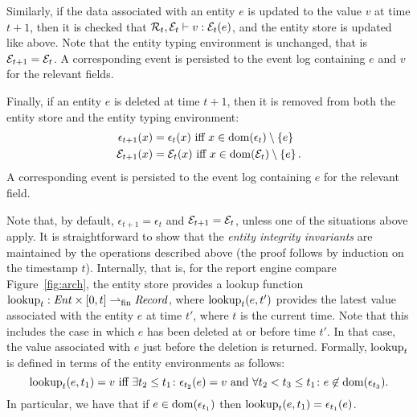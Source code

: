 Similarly, if the data associated with an entity $e$ is updated to the
value $v$ at time $t+1$, then it is checked that
${\mathcal R}_{t}, {\mathcal E}_{t} \vdash v : {\mathcal E}_t(e)$, and the entity store is
updated like above.
Note that the entity typing environment is unchanged, that is ${\mathcal E}_{t+1} =
{\mathcal E}_t$. A corresponding  event is persisted
to the event log containing $e$ and $v$ for the relevant fields.

Finally, if an entity $e$ is deleted at time $t+1$, then it is removed
from both the entity store and the entity typing environment:
\begin{align*}
  \epsilon_{t+1}(x) &= \epsilon_{t}(x) \text{ iff } x \in
  \dom{\epsilon_{t}} \setminus \set{e}\\%
  \calE_{t+1}(x) &= \calE_{t}(x) \text{ iff } x \in \dom{\calE_{t}}
  \setminus \set{e}.
\end{align*}
A corresponding  event is persisted to the
event log containing $e$ for the relevant field.

Note that, by default, $\epsilon_{t+1} = \epsilon_t$ and ${\mathcal E}_{t+1}
= {\mathcal E}_t$, unless one of the situations above apply. It is
straightforward to show that the \emph{entity integrity invariants}
are maintained by the operations described above (the proof follows by
induction on the timestamp $t$).  Internally, that is, for the report
engine compare Figure~\ref{fig:arch}, the entity store provides a
lookup function $\operatorname{lookup}_t : \mathit{Ent} \times [0,t] \rightharpoonup_{\mathrm{fin}} \mathit{Record}$,
where $\operatorname{lookup}_t(e,t')$ provides the latest value associated with
the entity $e$ at time $t'$, where $t$ is the current time. Note that
this includes the case in which $e$ has been deleted at or before time
$t'$. In that case, the value associated with $e$ just before the
deletion is returned. Formally, $\operatorname{lookup}_t$ is defined in terms of
the entity environments as follows:
\[
\operatorname{lookup}_t(e,t_1) = v \text{ iff } \exists t_2 \le t_1\colon
\epsilon_{t_2}(e) = v \text{ and } \forall t_2 < t_3 \le t_1\colon
e\not\in\operatorname{dom}(\epsilon_{t_3}).
\]
In particular, we have that if $e \in \operatorname{dom}(\epsilon_{t_1})$ then
$\operatorname{lookup}_t(e,t_1) = \epsilon_{t_1}(e)$.

